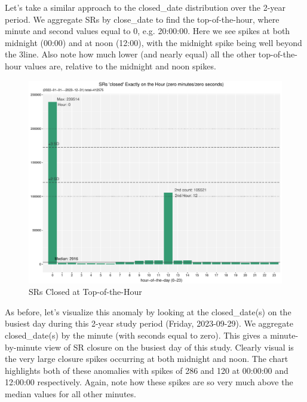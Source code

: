 \documentclass[12pt, titlepage]{article}
\begin{document}
	Let's take a similar approach to the closed\_date distribution over the 
	2-year period. We aggregate SRs by close\_date to find the top-of-the-hour, 
	where minute and second values equal to 0, e.g. 20:00:00. Here we see 
	spikes at both midnight (00:00) and at noon (12:00), with the midnight 
	spike being well beyond the 3\textsigma line. Also note how much lower 
	(and nearly equal) all the other top-of-the-hour values are, 
	relative to the midnight and noon spikes. 
	
	\begin{figure}[tbp]
		\centering
		\includegraphics[width = \textwidth]
		{2-year-trend-SR_closed_by_top_of_hour.pdf}
		\caption{SRs Closed at Top-of-the-Hour}
		\label{fig:tophourclosed}
	\end{figure}
	
	As before, let's visualize this anomaly by looking at the closed\_date(s) 
	on the busiest day during this 2-year study period (Friday, 2023-09-29). 
	We aggregate closed\_date(s) by the minute (with seconds equal to zero). 
	This gives a minute-by-minute view of SR closure on the busiest day 
	of this study. Clearly visual is the very large closure spikes occurring at 
	both midnight and noon. The chart highlights both of these anomalies 
	with spikes of 286 and 120 at 00:00:00 and 12:00:00 respectively. 
	Again, note how these spikes are so very much above the median 
	values for all other minutes.
\end{document}

